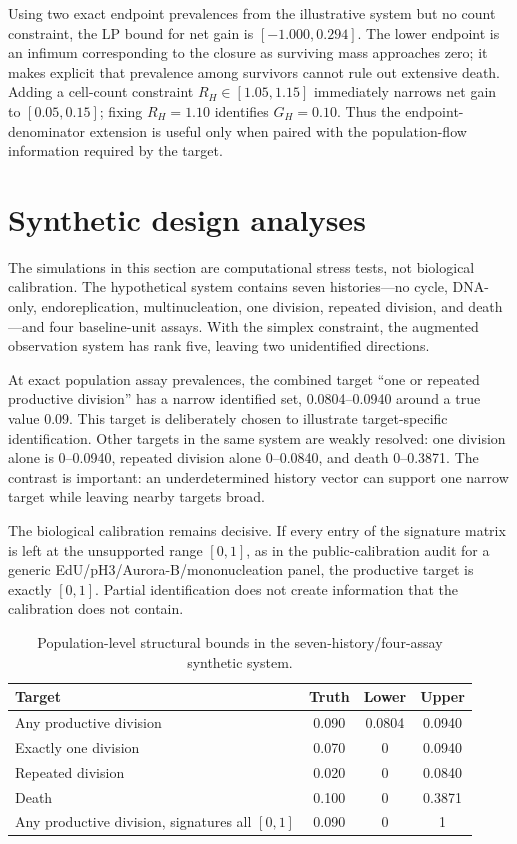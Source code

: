 \documentclass[11pt]{article}
\begin{document}
Using two exact endpoint prevalences from the illustrative system but no count constraint, the LP bound for net gain is $[-1.000,0.294]$. The lower endpoint is an infimum corresponding to the closure as surviving mass approaches zero; it makes explicit that prevalence among survivors cannot rule out extensive death. Adding a cell-count constraint $R_H\in[1.05,1.15]$ immediately narrows net gain to $[0.05,0.15]$; fixing $R_H=1.10$ identifies $G_H=0.10$. Thus the endpoint-denominator extension is useful only when paired with the population-flow information required by the target.

\section{Synthetic design analyses}
The simulations in this section are computational stress tests, not biological calibration. The hypothetical system contains seven histories---no cycle, DNA-only, endoreplication, multinucleation, one division, repeated division, and death---and four baseline-unit assays. With the simplex constraint, the augmented observation system has rank five, leaving two unidentified directions.

At exact population assay prevalences, the combined target ``one or repeated productive division'' has a narrow identified set, 0.0804--0.0940 around a true value 0.09. This target is deliberately chosen to illustrate target-specific identification. Other targets in the same system are weakly resolved: one division alone is 0--0.0940, repeated division alone 0--0.0840, and death 0--0.3871. The contrast is important: an underdetermined history vector can support one narrow target while leaving nearby targets broad.

The biological calibration remains decisive. If every entry of the signature matrix is left at the unsupported range $[0,1]$, as in the public-calibration audit for a generic EdU/pH3/Aurora-B/mononucleation panel, the productive target is exactly $[0,1]$. Partial identification does not create information that the calibration does not contain.

\begin{table}[ht]
\centering
\caption{Population-level structural bounds in the seven-history/four-assay synthetic system.}
\begin{tabular}{lccc}
\toprule
Target & Truth & Lower & Upper\\
\midrule
Any productive division & 0.090 & 0.0804 & 0.0940\\
Exactly one division & 0.070 & 0 & 0.0940\\
Repeated division & 0.020 & 0 & 0.0840\\
Death & 0.100 & 0 & 0.3871\\
Any productive division, signatures all $[0,1]$ & 0.090 & 0 & 1\\
\bottomrule
\end{tabular}
\end{table}
\end{document}

